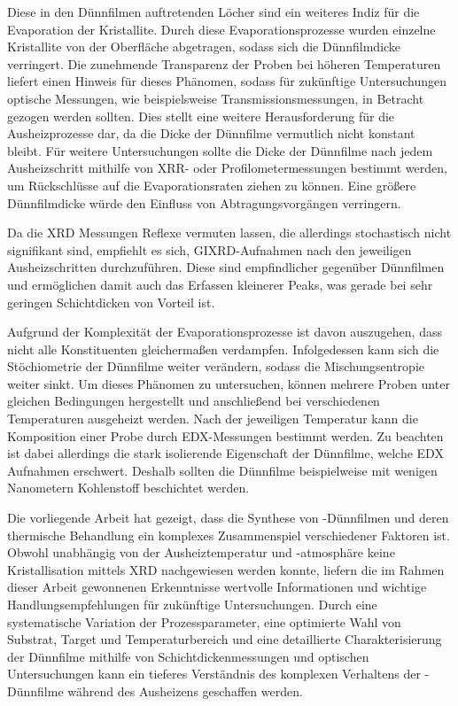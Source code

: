 Diese in den Dünnfilmen auftretenden Löcher sind ein weiteres Indiz für die Evaporation der Kristallite.
Durch diese Evaporationsprozesse wurden einzelne Kristallite von der Oberfläche abgetragen, sodass sich die
Dünnfilmdicke verringert.
Die zunehmende Transparenz der Proben bei höheren Temperaturen liefert einen Hinweis für dieses Phänomen,
sodass für zukünftige Untersuchungen optische Messungen, wie beispielsweise Transmissionsmessungen, in Betracht gezogen
werden sollten.
Dies stellt eine weitere Herausforderung für die Ausheizprozesse dar, da die Dicke der Dünnfilme vermutlich nicht
konstant bleibt.
Für weitere Untersuchungen sollte die Dicke der Dünnfilme nach jedem Ausheizschritt mithilfe von XRR- oder
Profilometermessungen bestimmt werden, um Rückschlüsse auf die Evaporationsraten ziehen zu können.
Eine größere Dünnfilmdicke würde den Einfluss von Abtragungsvorgängen verringern.

Da die XRD Messungen  Reflexe vermuten lassen, die allerdings stochastisch nicht signifikant sind,
empfiehlt es sich, GIXRD-Aufnahmen nach den jeweiligen Ausheizschritten durchzuführen.
Diese sind empfindlicher gegenüber Dünnfilmen und ermöglichen damit auch das Erfassen kleinerer Peaks, was gerade
bei sehr geringen Schichtdicken von Vorteil ist.

Aufgrund der Komplexität der Evaporationsprozesse ist davon auszugehen, dass nicht alle Konstituenten gleichermaßen
verdampfen.
Infolgedessen kann sich die Stöchiometrie der Dünnfilme weiter verändern, sodass die Mischungsentropie
weiter sinkt.
Um dieses Phänomen zu untersuchen, können mehrere Proben unter gleichen Bedingungen hergestellt und anschließend
bei verschiedenen Temperaturen ausgeheizt werden.
Nach der jeweiligen Temperatur kann die Komposition einer Probe durch EDX-Messungen bestimmt werden.
Zu beachten ist dabei allerdings die stark isolierende Eigenschaft der Dünnfilme, welche EDX Aufnahmen erschwert.
Deshalb sollten die Dünnfilme beispielweise mit wenigen Nanometern Kohlenstoff beschichtet werden.

Die vorliegende Arbeit hat gezeigt, dass die Synthese von \heo-Dünnfilmen und deren thermische Behandlung ein komplexes
Zusammenspiel verschiedener Faktoren ist.
Obwohl unabhängig von der Ausheiztemperatur und -atmosphäre keine Kristallisation mittels XRD nachgewiesen werden
konnte, liefern die im Rahmen dieser Arbeit gewonnenen Erkenntnisse wertvolle Informationen und wichtige
Handlungsempfehlungen für zukünftige Untersuchungen.
Durch eine systematische Variation der Prozessparameter, eine optimierte Wahl von Substrat, Target und Temperaturbereich
und eine detaillierte Charakterisierung der Dünnfilme mithilfe von Schichtdickenmessungen und optischen Untersuchungen
kann ein tieferes Verständnis des komplexen Verhaltens der \heo-Dünnfilme während des Ausheizens geschaffen werden.





